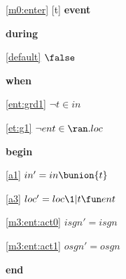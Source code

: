 \noindent \ref{m0:enter} [t] \textbf{event}
\begin{block}
\item \textbf{during}
\begin{block}
\item[ \eqref{default} ]$\false$ %
\end{block}
\item \textbf{when}
\begin{block}
\item[ \eqref{ent:grd1} ]$\neg t \in in $ %
\item[ \eqref{et:g1} ]$\neg ent \in \ran.loc $ %
\end{block}
\item \textbf{begin}
\begin{block}
\item[ \eqref{a1} ]$in' = in \bunion \{ t \} $ %
\item[ \eqref{a3} ]$loc' = loc \1| t \fun ent $ %
\item[ \eqref{m3:ent:act0} ]$isgn' = isgn$ %
\item[ \eqref{m3:ent:act1} ]$osgn' = osgn$ %
\end{block}
\item \textbf{end} \\
\end{block}
